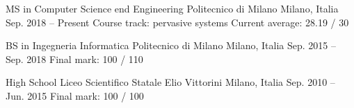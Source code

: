 

\begin{cventries}

\cventry
    {MS in Computer Science end Engineering}
    {Politecnico di Milano}
    {Milano, Italia}
    {Sep. 2018 -- Present}
    {Course track: pervasive systems {\enskip\cdotp\enskip} Current average: 28.19 / 30}
    
\cventry
    {BS in Ingegneria Informatica}
    {Politecnico di Milano}
    {Milano, Italia}
    {Sep. 2015 -- Sep. 2018}
    {Final mark: 100 / 110}
    
\cventry
    {High School}
    {Liceo Scientifico Statale Elio Vittorini}
    {Milano, Italia}
    {Sep. 2010 -- Jun. 2015}
    {Final mark: 100 / 100}
\end{cventries}
